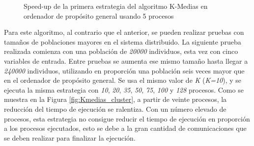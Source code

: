 \begin{figure}[!h]
	\centering
	\caption{Speed-up de la primera estrategia del algoritmo K-Medias en ordenador de propósito general usando 5 procesos}
	\label{fig:Kmedias_speedup}
\end{figure}




Para este algoritmo, al contrario que el anterior, se pueden realizar pruebas con tamaños de poblaciones mayores en el sistema distribuido. La siguiente prueba realizada comienza con una población de \textit{20000} individuos, esta vez con cinco variables de entrada. Entre pruebas se aumenta ese mismo tamaño hasta llegar a \textit{240000} individuos, utilizando en proporción una población seis veces mayor que en el ordenador de propósito general. Se usa el mismo valor de \textit{K} (\textit{K=10}), y se ejecuta la misma estrategia con \textit{10}, \textit{20}, \textit{35}, \textit{50}, \textit{75}, \textit{100} y \textit{128} procesos. Como se muestra en la Figura \ref{fig:Kmedias_cluster}, a partir de veinte procesos, la reducción del tiempo de ejecución se ralentiza. Con un número elevado de procesos, esta estrategia no consigue reducir el tiempo de ejecución en proporción a los procesos ejecutados, esto se debe a la gran cantidad de comunicaciones que se deben realizar para finalizar la ejecución.


